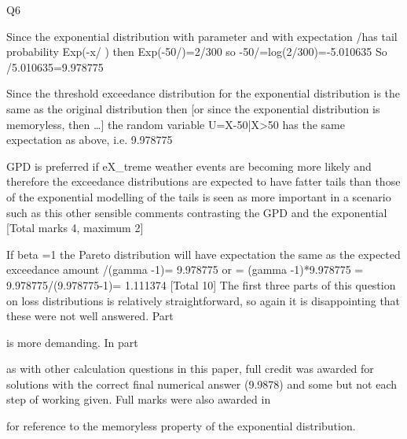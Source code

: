 Q6
\item  
Since the exponential distribution with parameter \lambda and with expectation /\lambda has tail probability
Exp(-x/ \mu ) then 
Exp(-50/\mu)=2/300 so
-50/\mu =log(2/300)=-5.010635 
So
/5.010635=9.978775 
\item   Since the threshold exceedance distribution for the exponential distribution is the same as the original distribution then 
[or since the exponential distribution is memoryless, then …]
the random variable U=X-50|X>50 has the same expectation as above, i.e. 9.978775 
\item  GPD is preferred if eX_{t}reme weather events are becoming more likely 
and therefore the exceedance distributions are expected to have fatter tails than
those of the exponential 
modelling of the tails is seen as more important in a scenario such as this 
other sensible comments contrasting the GPD and the exponential 
[Total marks 4, maximum 2]
\item 
If beta =1 the Pareto distribution will have expectation the same as the expected exceedance amount
\gamma /(gamma -1)= 9.978775 
or
\gamma = (gamma -1)*9.978775 
\gamma= 9.978775/(9.978775-1)= 1.111374 
[Total 10]
The first three parts of this question on loss distributions is relatively straightforward, so again it is disappointing that these were not well answered.
Part \item  is more demanding.
\medskip 
In part \item   as with other calculation questions in this paper, full credit was awarded for solutions with the correct final numerical answer (9.9878) and some but not each step of working given.
Full marks were also awarded in \item   for reference to the memoryless property of the exponential distribution.
